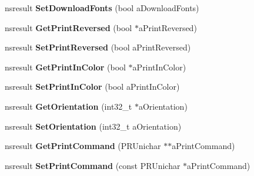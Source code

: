 \begin{DoxyCompactItemize}
\item 
\mbox{\label{interfacens_i_print_settings_a486127b18db7992bc6a78128036d0f9a}} 
nsresult {\bfseries Set\+Download\+Fonts} (bool a\+Download\+Fonts)
\item 
\mbox{\label{interfacens_i_print_settings_a8e0f47b5df80d95afa7709f75972f59e}} 
nsresult {\bfseries Get\+Print\+Reversed} (bool $\ast$a\+Print\+Reversed)
\item 
\mbox{\label{interfacens_i_print_settings_af9f8049d5a91ff9352f00de6c43b699b}} 
nsresult {\bfseries Set\+Print\+Reversed} (bool a\+Print\+Reversed)
\item 
\mbox{\label{interfacens_i_print_settings_afe6ebfc4263ff0ba9f981da82a0d76df}} 
nsresult {\bfseries Get\+Print\+In\+Color} (bool $\ast$a\+Print\+In\+Color)
\item 
\mbox{\label{interfacens_i_print_settings_aafde892b59b43b9bc6176f0a8fff78cb}} 
nsresult {\bfseries Set\+Print\+In\+Color} (bool a\+Print\+In\+Color)
\item 
\mbox{\label{interfacens_i_print_settings_a9fa5494827ea94a8b38a1d44a917f5e2}} 
nsresult {\bfseries Get\+Orientation} (int32\+\_\+t $\ast$a\+Orientation)
\item 
\mbox{\label{interfacens_i_print_settings_a8e49a9a6cb176a846e284ffb142d1709}} 
nsresult {\bfseries Set\+Orientation} (int32\+\_\+t a\+Orientation)
\item 
\mbox{\label{interfacens_i_print_settings_a2c9d1618916acb8d9cf2a92eb827e5c2}} 
nsresult {\bfseries Get\+Print\+Command} (P\+R\+Unichar $\ast$$\ast$a\+Print\+Command)
\item 
\mbox{\label{interfacens_i_print_settings_a00aa1a37d2de38a1de13979d58186966}} 
nsresult {\bfseries Set\+Print\+Command} (const P\+R\+Unichar $\ast$a\+Print\+Command)
\item 
\mbox{\label{interfacens_i_print_settings_a633c54d0c739949ac140b9a04a4ebf6c}} 
$$
\end{DoxyCompactItemize}
